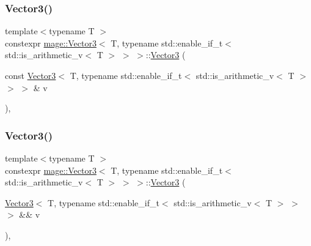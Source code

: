 \subsubsection{\texorpdfstring{Vector3()}{Vector3()}\hspace{0.1cm}{\footnotesize\ttfamily [5/7]}}
{\footnotesize\ttfamily template$<$typename T $>$ \\
constexpr \hyperlink{structmage_1_1_vector3}{mage\+::\+Vector3}$<$ T, typename std\+::enable\+\_\+if\+\_\+t$<$ std\+::is\+\_\+arithmetic\+\_\+v$<$ T $>$ $>$ $>$\+::\hyperlink{structmage_1_1_vector3}{Vector3} (\begin{DoxyParamCaption}\item[{const \hyperlink{structmage_1_1_vector3}{Vector3}$<$ T, typename std\+::enable\+\_\+if\+\_\+t$<$ std\+::is\+\_\+arithmetic\+\_\+v$<$ T $>$ $>$ $>$ \&}]{v }\end{DoxyParamCaption})\hspace{0.3cm}{\ttfamily [default]}, {\ttfamily [noexcept]}}

\hypertarget{structmage_1_1_vector3_3_01_t_00_01typename_01std_1_1enable__if__t_3_01std_1_1is__arithmetic__v_3_01_t_01_4_01_4_01_4_af650c13f7b0d3c3cf3a6f967a05b7f65}{}\label{structmage_1_1_vector3_3_01_t_00_01typename_01std_1_1enable__if__t_3_01std_1_1is__arithmetic__v_3_01_t_01_4_01_4_01_4_af650c13f7b0d3c3cf3a6f967a05b7f65} 
\subsubsection{\texorpdfstring{Vector3()}{Vector3()}\hspace{0.1cm}{\footnotesize\ttfamily [6/7]}}
{\footnotesize\ttfamily template$<$typename T $>$ \\
constexpr \hyperlink{structmage_1_1_vector3}{mage\+::\+Vector3}$<$ T, typename std\+::enable\+\_\+if\+\_\+t$<$ std\+::is\+\_\+arithmetic\+\_\+v$<$ T $>$ $>$ $>$\+::\hyperlink{structmage_1_1_vector3}{Vector3} (\begin{DoxyParamCaption}\item[{\hyperlink{structmage_1_1_vector3}{Vector3}$<$ T, typename std\+::enable\+\_\+if\+\_\+t$<$ std\+::is\+\_\+arithmetic\+\_\+v$<$ T $>$ $>$ $>$ \&\&}]{v }\end{DoxyParamCaption})\hspace{0.3cm}{\ttfamily [default]}, {\ttfamily [noexcept]}}

